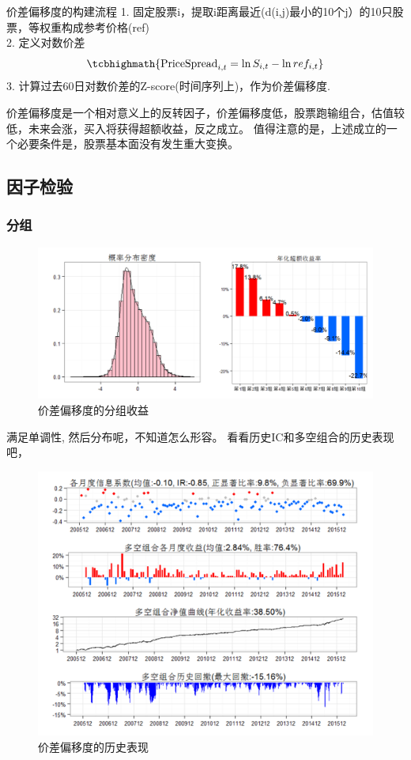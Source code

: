 \documentclass[12pt]{article}
\theoremstyle{definition}
\begin{document}
\begin{sconclude}{价差偏移度的构建流程}{}
1. 固定股票i，提取i距离最近(d(i,j)最小的10个j）的10只股票，等权重构成参考价格(ref)\\
2. 定义对数价差 $$ \tcbhighmath{\text{PriceSpread}_{i,t}=\ln{S_{i,t}}-\ln{ref_{i,t}}}$$ 
3. 计算过去60日对数价差的Z-score(时间序列上)，作为价差偏移度.

\end{sconclude}
\begin{sremark}{}{}
价差偏移度是一个相对意义上的反转因子，价差偏移度低，股票跑输组合，估值较低，未来会涨，买入将获得超额收益，反之成立。 值得注意的是，上述成立的一个必要条件是，股票基本面没有发生重大变换。
\end{sremark}


\subsection{因子检验}
\subsubsection{分组}
\begin{figure}[htb]
	\centering
	\includegraphics[scale=0.45]{figure/价差偏移度_分组.png}
	\caption{价差偏移度的分组收益}
\end{figure}
满足单调性, 然后分布呢，不知道怎么形容。
看看历史IC和多空组合的历史表现吧，
\begin{figure}[htb]
	\centering
	\includegraphics[scale=0.7]{figure/价差偏离度_历史表现.png}
	\caption{价差偏移度的历史表现}
\end{figure}
\end{document}
